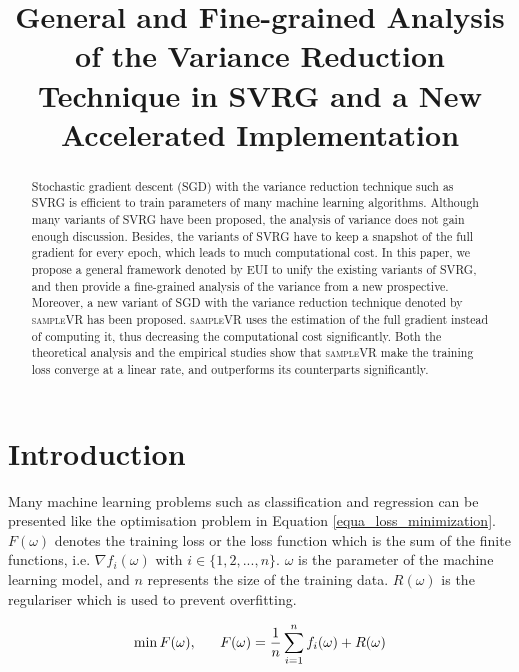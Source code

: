 \documentclass[letterpaper]{article}
\begin{document}
%
\title{General and Fine-grained Analysis of the Variance Reduction Technique in SVRG and a New Accelerated Implementation}
\maketitle
\begin{abstract}
Stochastic gradient descent (SGD) with the variance reduction  technique such as SVRG is efficient to train parameters of many machine learning algorithms. Although many variants of SVRG have been proposed,  the analysis of variance does not gain enough discussion. Besides,  the variants of SVRG have to keep a snapshot of the full gradient for every epoch, which leads to much computational cost. In this paper, we propose a general framework denoted by EUI  to unify the existing variants of SVRG, and then  provide a fine-grained analysis of the variance from a new prospective. Moreover,   a new variant of SGD with the variance reduction technique denoted by \textsc{sampleVR} has been proposed. \textsc{sampleVR} uses the estimation of the full gradient instead of computing it, thus decreasing the computational cost significantly.  Both the theoretical analysis and the empirical studies show that \textsc{sampleVR}  make the training loss converge at a linear rate, and outperforms its counterparts significantly. 
\end{abstract}

\section{Introduction}
\label{sect_introduction}
Many machine learning problems such as classification and regression  can be  presented like the optimisation problem in Equation \ref{equa_loss_minimization}. $F(\omega)$ denotes the training loss or the loss function which is the sum of the finite functions, i.e. $\nabla f_i(\omega)$ with $i\in\{1,2, ..., n\}$. $\omega$ is the parameter of the machine learning model, and $n$ represents the size of the training data. $R(\omega)$ is the regulariser  which is used to prevent overfitting.    

\begin{equation}
\label{equa_loss_minimization}
\min F(\omega),~~~~~F(\omega)=\frac{1}{n}\sum\limits_{i=1}^n f_i(\omega)+R(\omega)\\
\end{equation}
\end{document}
